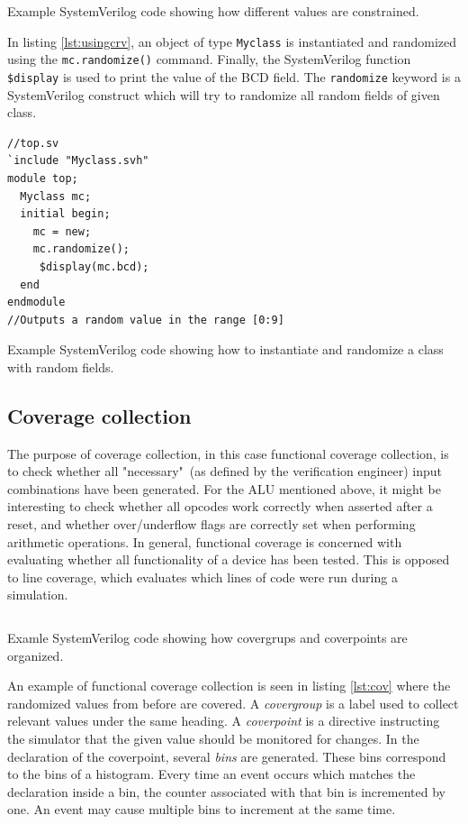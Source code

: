 \documentclass[conference]{IEEEtran}
\newcommand{\SV}{SystemVerilog\xspace}
\begin{document}
\begin{listing}[htbp]
\inputminted{systemverilog}{snippets/Myclass.svh}
\caption{Example SystemVerilog code showing how different values are constrained.}
\label{lst:crv}
\end{listing}

In listing \ref{lst:usingcrv}, an object of type \texttt{Myclass} is instantiated and randomized using the \texttt{mc.randomize()} command. Finally, the \SV function \texttt{\$display} is used to print the value of the BCD field. The \texttt{randomize} keyword is a \SV construct which will try to randomize all random fields of given class.

\begin{listing}[htbp]
\begin{verbatim}
//top.sv
`include "Myclass.svh"
module top;
  Myclass mc;
  initial begin;
    mc = new;
    mc.randomize();
	 $display(mc.bcd);
  end
endmodule
//Outputs a random value in the range [0:9]
\end{verbatim}
\caption{Example SystemVerilog code showing how to instantiate and randomize a class with random fields.}
\label{lst:usingcrv}
\end{listing}

\subsection{Coverage collection}
The purpose of coverage collection, in this case functional coverage collection, is to check whether all "necessary"\, (as defined by the verification engineer) input combinations have been generated. For the ALU mentioned above, it might be interesting to check whether all opcodes work correctly when asserted after a reset, and whether over/underflow flags are correctly set when performing arithmetic operations. In general, functional coverage is concerned with evaluating whether all functionality of a device has been tested. This is opposed to line coverage, which evaluates which lines of code were run during a simulation.

\begin{listing}[htbp]
	\inputminted{systemverilog}{snippets/Cover.svh}
	\caption{Examle SystemVerilog code showing how covergrups and coverpoints are organized.}
	\label{lst:cov}
\end{listing}

An example of functional coverage collection is seen in listing \ref{lst:cov} where the randomized values from before are covered. A \textit{covergroup} is a label used to collect relevant values under the same heading. A \textit{coverpoint} is a directive instructing the simulator that the given value should be monitored for changes. In the declaration of the coverpoint, several \textit{bins} are generated. These bins correspond to the bins of a histogram. Every time an event occurs which matches the declaration inside a bin, the counter associated with that bin is incremented by one. An event may cause multiple bins to increment at the same time.
\end{document}
